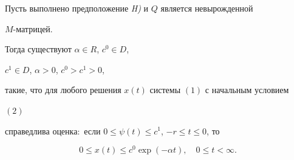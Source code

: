 \begin{thm}


Пусть выполнено предположение {\em H)} и $Q$ является невырожденной


$M$-мат\-рицей.


Тогда существуют $\alpha \in R$, $c^0\in D$,


$c^1\in D$, $\alpha>0$, $c^0>c^1>0$,


такие, что для любого решения $x(t)$ системы $(1)$ с начальным условием


$(2)$


справедлива оценка$:$ если $0 \le\psi(t)\le c^1$, $-r\le t\le 0$, то


\begin{equation}


0 \le x(t) \le c^0 \exp(-\alpha t), \quad 0 \le t < \infty.


\end{equation}


\end{thm}





